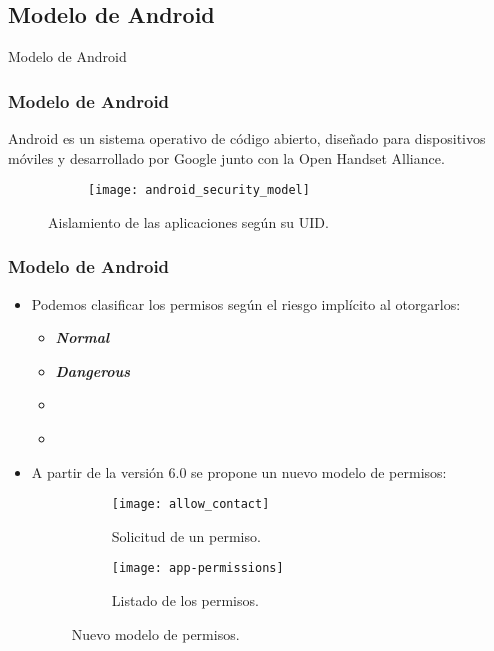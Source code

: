 \subsection{Modelo de Android}
\begin{frame}
 \begin{center}
  \LARGE Modelo de Android
 \end{center}
\end{frame}
\begin{frame}
 \frametitle{Modelo de Android}
 {Android es un sistema operativo de código abierto, diseñado para dispositivos móviles y desarrollado por Google junto con la Open Handset Alliance.}\pause
 \begin{figure}[H]
    \centering
    \begin{subfigure}{0.75\linewidth}
		\texttt{[image: android\_security\_model]}
	    \label{fig:ch01:sandbox}
    \end{subfigure}
    \caption{Aislamiento de las aplicaciones según su UID.}
 \end{figure}
\end{frame}
\begin{frame}
 \frametitle{Modelo de Android}
 \begin{small}
 \begin{itemize}[<+->]
     \item Podemos clasificar los permisos según el riesgo implícito al otorgarlos:
     \begin{multicols}{2}
     \begin{itemize}[<+->]\small
      \item \emph{\textbf<6->{Normal}}
      \item \emph{\textbf<6->{Dangerous}}
      \item \emph{}
      \item \emph{}
     \end{itemize}
     \end{multicols}\pause
     \item A partir de la versión 6.0 se propone un nuevo modelo de permisos:\pause
         \begin{figure}[btp]
            \begin{subfigure}{0.4\linewidth}
            \centering
                \texttt{[image: allow\_contact]}
                \caption{Solicitud de un permiso.}
            \end{subfigure}
        \begin{subfigure}{0.4\linewidth}\pause
        \centering
            \texttt{[image: app-permissions]}
            \caption{Listado de los permisos.}
    	\end{subfigure}
    	\caption{Nuevo modelo de permisos.}
        \end{figure}
 \end{itemize}
  \end{small}
\end{frame}

